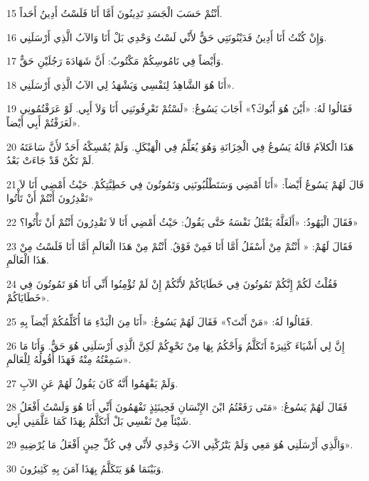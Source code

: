 \par 15 أَنْتُمْ حَسَبَ الْجَسَدِ تَدِينُونَ أَمَّا أَنَا فَلَسْتُ أَدِينُ أَحَداً.
\par 16 وَإِنْ كُنْتُ أَنَا أَدِينُ فَدَيْنُونَتِي حَقٌّ لأَنِّي لَسْتُ وَحْدِي بَلْ أَنَا وَالآبُ الَّذِي أَرْسَلَنِي.
\par 17 وَأَيْضاً فِي نَامُوسِكُمْ مَكْتُوبٌ: أَنَّ شَهَادَةَ رَجُلَيْنِ حَقٌّ.
\par 18 أَنَا هُوَ الشَّاهِدُ لِنَفْسِي وَيَشْهَدُ لِي الآبُ الَّذِي أَرْسَلَنِي».
\par 19 فَقَالُوا لَهُ: «أَيْنَ هُوَ أَبُوكَ؟» أَجَابَ يَسُوعُ: «لَسْتُمْ تَعْرِفُونَنِي أَنَا وَلاَ أَبِي. لَوْ عَرَفْتُمُونِي لَعَرَفْتُمْ أَبِي أَيْضاً».
\par 20 هَذَا الْكلاَمُ قَالَهُ يَسُوعُ فِي الْخِزَانَةِ وَهُوَ يُعَلِّمُ فِي الْهَيْكَلِ. وَلَمْ يُمْسِكْهُ أَحَدٌ لأَنَّ سَاعَتَهُ لَمْ تَكُنْ قَدْ جَاءَتْ بَعْدُ.
\par 21 قَالَ لَهُمْ يَسُوعُ أَيْضاً: «أَنَا أَمْضِي وَسَتَطْلُبُونَنِي وَتَمُوتُونَ فِي خَطِيَّتِكُمْ. حَيْثُ أَمْضِي أَنَا لاَ تَقْدِرُونَ أَنْتُمْ أَنْ تَأْتُوا»
\par 22 فَقَالَ الْيَهُودُ: «أَلَعَلَّهُ يَقْتُلُ نَفْسَهُ حَتَّى يَقُولُ: حَيْثُ أَمْضِي أَنَا لاَ تَقْدِرُونَ أَنْتُمْ أَنْ تَأْتُوا؟»
\par 23 فَقَالَ لَهُمْ: « أَنْتُمْ مِنْ أَسْفَلُ أَمَّا أَنَا فَمِنْ فَوْقُ. أَنْتُمْ مِنْ هَذَا الْعَالَمِ أَمَّا أَنَا فَلَسْتُ مِنْ هَذَا الْعَالَمِ.
\par 24 فَقُلْتُ لَكُمْ إِنَّكُمْ تَمُوتُونَ فِي خَطَايَاكُمْ لأَنَّكُمْ إِنْ لَمْ تُؤْمِنُوا أَنِّي أَنَا هُوَ تَمُوتُونَ فِي خَطَايَاكُمْ».
\par 25 فَقَالُوا لَهُ: «مَنْ أَنْتَ؟» فَقَالَ لَهُمْ يَسُوعُ: «أَنَا مِنَ الْبَدْءِ مَا أُكَلِّمُكُمْ أَيْضاً بِهِ.
\par 26 إِنَّ لِي أَشْيَاءَ كَثِيرَةً أَتَكَلَّمُ وَأَحْكُمُ بِهَا مِنْ نَحْوِكُمْ لَكِنَّ الَّذِي أَرْسَلَنِي هُوَ حَقٌّ. وَأَنَا مَا سَمِعْتُهُ مِنْهُ فَهَذَا أَقُولُهُ لِلْعَالَمِ».
\par 27 وَلَمْ يَفْهَمُوا أَنَّهُ كَانَ يَقُولُ لَهُمْ عَنِ الآبِ.
\par 28 فَقَالَ لَهُمْ يَسُوعُ: «مَتَى رَفَعْتُمُ ابْنَ الإِنْسَانِ فَحِينَئِذٍ تَفْهَمُونَ أَنِّي أَنَا هُوَ وَلَسْتُ أَفْعَلُ شَيْئاً مِنْ نَفْسِي بَلْ أَتَكَلَّمُ بِهَذَا كَمَا عَلَّمَنِي أَبِي.
\par 29 وَالَّذِي أَرْسَلَنِي هُوَ مَعِي وَلَمْ يَتْرُكْنِي الآبُ وَحْدِي لأَنِّي فِي كُلِّ حِينٍ أَفْعَلُ مَا يُرْضِيهِ».
\par 30 وَبَيْنَمَا هُوَ يَتَكَلَّمُ بِهَذَا آمَنَ بِهِ كَثِيرُونَ.
